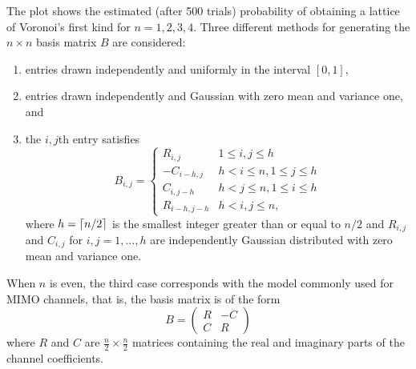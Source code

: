 \documentclass[a4paper,10pt]{article}
\begin{document}



The plot shows the estimated (after 500 trials) probability of obtaining a lattice of Voronoi's first kind for $n=1,2,3,4$.  Three different methods for generating the $n \times n$ basis matrix $B$ are considered: 
\begin{enumerate}
\item entries drawn independently and uniformly in the interval $[0,1]$, 
\item entries drawn independently and Gaussian with zero mean and variance one, and 
\item the $i,j$th entry satisfies
\[
B_{i,j} = \begin{cases}
R_{i,j} & 1 \leq i,j \leq h \\
-C_{i-h,j} & h < i \leq n, 1 \leq j \leq h \\
C_{i,j-h} & h < j \leq n, 1 \leq i \leq h \\
R_{i-h,j-h} & h < i,j \leq n,
\end{cases}
\]
where $h = \lceil n/2 \rceil$ is the smallest integer greater than or equal to $n/2$ and $R_{i,j}$ and $C_{i,j}$ for $i,j = 1,\dots,h$ are independently Gaussian distributed with zero mean and variance one. 
\end{enumerate}
When $n$ is even, the third case corresponds with the model commonly used for MIMO channels, that is, the basis matrix is of the form
\[
B = \left(\begin{array}{cc}
R & -C \\
C & R
\end{array}\right)
\]
where $R$ and $C$ are $\tfrac{n}{2} \times \tfrac{n}{2}$ matrices containing the real and imaginary parts of the channel coefficients.
\end{document}
